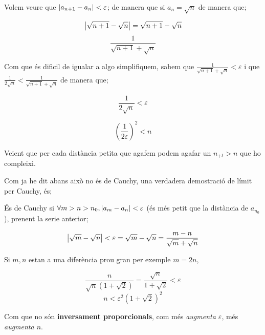 \documentclass[12pt]{article}
\begin{document}
    \begin{examplebox}{}
        Volem veure que $\abs{a_{n+1} - a_n}<\varepsilon$; de manera que si $a_n = \sqrt{n}$ de manera que;

        \[\abs{\sqrt{n+1}-\sqrt{n}} = \sqrt{n+1} - \sqrt{n}\]
        \[\frac{1}{\sqrt{n+1} + \sqrt{n}}\]

        Com que és dificil de igualar a algo simplifiquem, sabem que $\frac{1}{\sqrt{n+1} + \sqrt{n}} < \varepsilon$ i que $\frac{1}{2\sqrt{n}} < \frac{1}{\sqrt{n+1}+\sqrt{n}}$ de manera que;

        \[ \frac{1}{2\sqrt{n}} < \varepsilon\]

        \[(\frac{1}{2\varepsilon})^2<n\] 

        Veient que per cada distància petita que agafem podem agafar un $n_{+t} > n$ que ho compleixi.
    \end{examplebox}

    Com ja he dit abans això no és de Cauchy, una verdadera demostració de límit per Cauchy, és;

    \begin{examplebox}{}
        És de Cauchy si $\forall m>n>n_0, \abs{a_m-a_n}<\varepsilon$ (és més petit que la distància de $a_{n_0}$), prenent la serie anterior;

        \[\abs{\sqrt{m} - \sqrt{n}} < \varepsilon = \sqrt{m} - \sqrt{n} = \frac{m-n}{\sqrt{m} + \sqrt{n}}\]

        Si $m,n$ estan a una diferència prou gran per exemple $m = 2n$, 

        \[\frac{n}{\sqrt{n} (1+\sqrt{2})} = \frac{\sqrt{n}}{1+\sqrt{2}} < \varepsilon\]
        \[n<\varepsilon^2(1+\sqrt{2})^2\]
        
        Com que no són \textbf{inversament proporcionals}, com més \textit{augmenta $\varepsilon$}, més \textit{augmenta $n$}.
    \end{examplebox}
\end{document}
